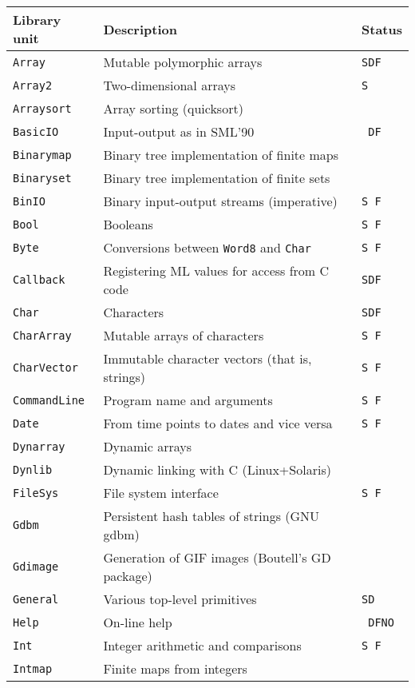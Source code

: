 \documentclass[fleqn]{article}
\begin{document}
\begin{center}\renewcommand{\arraystretch}{0.88}
\begin{tabular}{@{}|lll|}\hline
Library unit & Description & Status\\\hline
{\tt Array}  & Mutable polymorphic arrays & {\tt SDF}\\
{\tt Array2} & Two-dimensional arrays & {\tt S }\\
{\tt Arraysort} &  Array sorting (quicksort) & \\
{\tt BasicIO} &  Input-output as in SML'90 & {\tt \ DF}\\
{\tt Binarymap} &  Binary tree implementation of finite maps &\\
{\tt Binaryset} &  Binary tree implementation of finite sets &\\
{\tt BinIO}  & Binary input-output streams (imperative) & {\tt S F}\\
{\tt Bool}  & Booleans & {\tt S F}\\
{\tt Byte}  &  Conversions between {\tt Word8} and {\tt Char} & {\tt S F}\\
{\tt Callback}  &  Registering ML values for access from C code & {\tt SDF}\\
{\tt Char}  &  Characters & {\tt SDF}\\
{\tt CharArray} & Mutable arrays of characters & {\tt S F}\\
{\tt CharVector} & Immutable character vectors (that is, strings) & {\tt S F}\\
{\tt CommandLine} & Program name and arguments & {\tt S F}\\
{\tt Date}   & From time points to dates and vice versa& {\tt S F}\\
{\tt Dynarray} & Dynamic arrays & \\
{\tt Dynlib}  & Dynamic linking with C (Linux+Solaris)  & \\
{\tt FileSys} & File system interface & {\tt S F}\\
{\tt Gdbm}    & Persistent hash tables of strings (GNU gdbm) & \\
{\tt Gdimage} & Generation of GIF images (Boutell's GD package) & \\
{\tt General} & Various top-level primitives & {\tt SD}\\
{\tt Help} & On-line help & {\tt \ DFNO}\\
{\tt Int} & Integer arithmetic and comparisons & {\tt S F}\\
{\tt Intmap} & Finite maps from integers & \\

\end{tabular}
\end{center}
\end{document}
